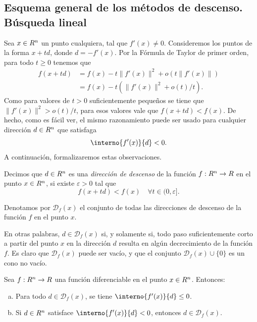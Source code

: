 \subsection{Esquema general de los métodos de descenso. Búsqueda lineal}

Sea $x \in R^n$ un punto cualquiera, tal que $f'(x) \neq 0$. Consideremos los puntos de la forma $x + td$, donde $d = -f'(x)$. Por la Fórmula de Taylor de primer orden, para todo $t \ge 0$ tenemos que
\begin{align*}
    f(x + td) &= f(x) - t \|f'(x)\|^2 + o(t\|f'(x)\|) \\
              &= f(x) - t(\|f'(x)\|^2 + o(t)/t).
\end{align*}
Como para valores de $t > 0$ suficientemente pequeños se tiene que $\|f'(x)\|^2 > o(t)/t$, para esos valores vale que $f(x + td) < f(x)$. De hecho, como es fácil ver, el mismo razonamiento puede ser usado para cualquier dirección $d \in R^n$ que satisfaga
\[
    \interno{f'(x)}{d} < 0.
\]
A continuación, formalizaremos estas observaciones.

\begin{definition}\label{v2:def:3.1.1}
    Decimos que $d \in R^n$ es una \textit{dirección de descenso} de la función $f : R^n \to R$ en el punto $x \in R^n$, si existe $\varepsilon > 0$ tal que
    \[
        f(x + td) < f(x) \quad \forall t \in (0, \varepsilon].
    \]
\end{definition}

Denotamos por $\mathcal{D}_f(x)$ el conjunto de todas las direcciones de descenso de la función $f$ en el punto $x$.

En otras palabras, $d \in \mathcal{D}_f(x)$ si, y solamente si, todo paso suficientemente corto a partir del punto $x$ en la dirección $d$ resulta en algún decrecimiento de la función $f$.
Es claro que $\mathcal{D}_f(x)$ puede ser vacío, y que el conjunto $\mathcal{D}_f(x) \cup \{0\}$ es un cono no vacío.

\begin{lemma}\label{v2:lem:3.1.1}
    Sea $f : R^n \to R$ una función diferenciable en el punto $x \in R^n$. Entonces:
    \begin{enumerate}[(a)]
        \item Para todo $d \in \mathcal{D}_f(x)$, se tiene $\interno{f'(x)}{d} \le 0$.
        \item Si $d \in R^n$ satisface $\interno{f'(x)}{d} < 0$, entonces $d \in \mathcal{D}_f(x)$.
    \end{enumerate}
\end{lemma}

